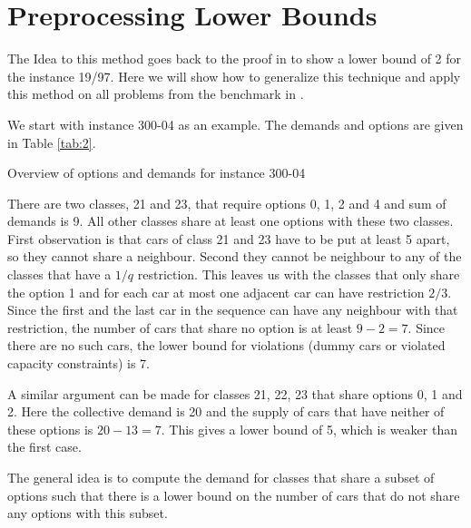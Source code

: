 \documentclass[]{llncs}
\begin{document}
\section{Preprocessing Lower Bounds}

The Idea to this method goes back to the proof in \cite{Gent98} to show a lower bound of 2 for the instance 19/97. Here
we will show how to generalize this technique and apply this method on all problems from the benchmark in \cite{Gravel05}. 

We start with instance 300-04 as an example. The demands and options are given in Table \ref{tab:2}. 

\begin{table}[htbp]
    \caption{Overview of options and demands for instance 300-04}
    \centering
    
    \label{tab:2}
\end{table}

There are two classes, 21 and 23, that require options 0, 1, 2 and 4 and sum of demands is 9. All other classes share at
least one options with these two classes.  First observation is that cars of class 21 and 23 have to be put at least 5
apart, so they cannot share a neighbour.  Second they cannot be neighbour to any of the classes that have a $1/q$
restriction. This leaves us with the classes that only share the option 1 and for each car at most one adjacent car can
have restriction $2/3$. Since the first and the last car in the sequence can have any neighbour with that restriction,
the number of cars that share no option is at least $9-2=7$. Since there are no such cars, the lower bound for
violations (dummy cars or violated capacity constraints) is 7. 

A similar argument can be made for classes 21, 22, 23 that share options 0, 1 and 2. Here the collective demand is 20
and the supply of cars that have neither of these options is $20 - 13 = 7$. This gives a lower bound of 5, which is weaker than the
first case. 

The general idea is to compute the demand for classes that share a subset of options such that there is a lower bound on
the number of cars that do not share any options with this subset.
\end{document}
